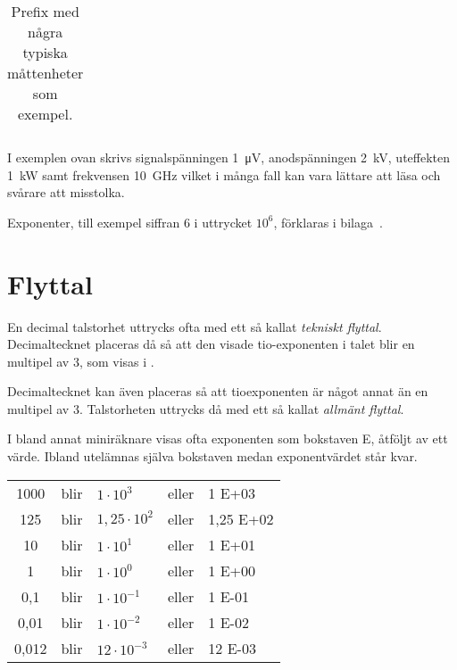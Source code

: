 \begin{table*}[b]
\begin{center}
\begin{tabular}{|Sllll|}
      \hline
    \end{tabular}
  \end{center}
  \caption{Prefix med några typiska måttenheter som exempel.}
  \label{tab:prefix}
\end{table*}

I exemplen ovan skrivs signalspänningen \qty{1}{\micro\volt}, anodspänningen
\qty{2}{\kilo\volt}, uteffekten \qty{1}{\kilo\watt} samt frekvensen
\qty{10}{\giga\hertz} vilket i många fall kan vara lättare att läsa och svårare
att misstolka.

Exponenter, till exempel siffran 6 i uttrycket \(10^6\), förklaras i
bilaga~.


\section{Flyttal}

En decimal talstorhet uttrycks ofta med ett så kallat \emph{tekniskt flyttal}.
Decimaltecknet placeras då så att den visade tio-exponenten i talet blir en
multipel av 3, som visas i .

Decimaltecknet kan även placeras så att tioexponenten är något annat än en
multipel av 3.
Talstorheten uttrycks då med ett så kallat \emph{allmänt flyttal}.

I bland annat miniräknare visas ofta exponenten som bokstaven E, åtföljt av ett
värde.
Ibland utelämnas själva bokstaven medan exponentvärdet står kvar.

\bigskip

\noindent\begin{tabular}{Sllll}
1000  & blir & \(1    \cdot 10^3  \) & eller & 1 E+03 \\
125   & blir & \(1,25 \cdot 10^2  \) & eller & 1,25 E+02 \\
10    & blir & \(1    \cdot 10^1  \) & eller & 1 E+01 \\
1     & blir & \(1    \cdot 10^0  \) & eller & 1 E+00 \\
0,1   & blir & \(1    \cdot 10^{-1}\) & eller & 1 E-01 \\
0,01  & blir & \(1    \cdot 10^{-2}\) & eller & 1 E-02 \\
0,012 & blir & \(12   \cdot 10^{-3}\) & eller & 12 E-03 \\
\end{tabular}

